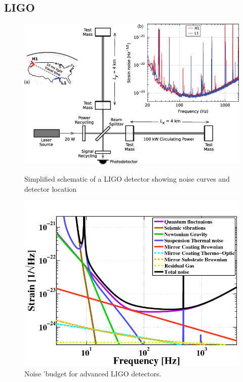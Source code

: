 \documentclass[]{article}
\begin{document}
\subsection{LIGO}
\begin{figure}
	\includegraphics[scale=0.45]{fig4.png}
	\centering
	\caption{Simplified schematic of a LIGO detector\cite{advfig} showing noise curves and detector location}
	\centering
	\includegraphics[scale=0.40]{fig5.png}
	\centering
	\caption{\cite{noisecurve}Noise 'budget for advanced LIGO detectors.}
	\centering
\end{figure}
\end{document}
